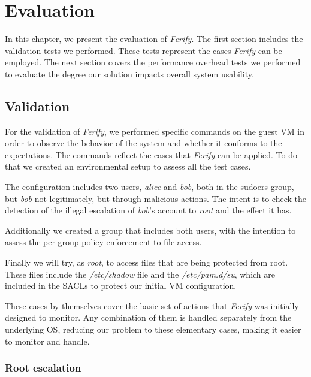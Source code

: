 \acresetall
\chapter{Evaluation}\label{ch:chapter4}

In this chapter, we present the evaluation of \emph{Ferify}. The first section includes the validation tests we performed. These tests represent the cases \emph{Ferify} can be employed. The next section covers the performance overhead tests we performed to evaluate the degree our solution impacts overall system usability.

\section{Validation}\label{sec:validation}

\par For the validation of \emph{Ferify}, we performed specific commands on the guest \ac{VM} in order to observe the behavior of the system and whether it conforms to the expectations. The commands reflect the cases that \emph{Ferify} can be applied. To do that we created an environmental setup to assess all the test cases. 

\par The configuration includes two users, \emph{alice} and \emph{bob}, both in the sudoers group, but \emph{bob} not legitimately, but through malicious actions. The intent is to check the detection of the illegal escalation of \emph{bob}'s account to \emph{root} and the effect it has.

\par Additionally we created a group that includes both users, with the intention to assess the per group policy enforcement to file access. 

\par Finally we will try, as \emph{root}, to access files that are being protected from root. These files include the \emph{/etc/shadow} file and the \emph{/etc/pam.d/su}, which are included in the \acp{SACL} to protect our initial \ac{VM} configuration.

\par These cases by themselves cover the basic set of actions that \emph{Ferify} was initially designed to monitor. Any combination of them is handled separately from the underlying \ac{OS}, reducing our problem to these elementary cases, making it easier to monitor and handle.

\subsection{Root escalation}

